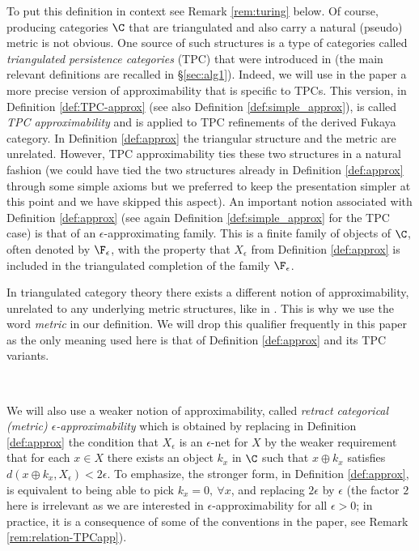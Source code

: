 To put this definition in context see Remark \ref{rem:turing} below. Of course, producing categories $\C$ that are triangulated and also carry a natural (pseudo) metric is not obvious. One source of such structures is a type of categories called {\em triangulated persistence categories} (TPC) that
were introduced in \cite{BCZ:tpc} (the main relevant definitions are recalled in \S\ref{sec:alg1}).  Indeed, we will use in the paper a more precise version of approximability that is specific to TPCs. This version, in Definition \ref{def:TPC-approx} (see also Definition \ref{def:simple_approx}), is called {\em TPC approximability} and is applied to TPC refinements of the derived Fukaya category.  In Definition \ref{def:approx} the triangular structure and the metric are unrelated.  However, TPC approximability  ties these two structures in a natural fashion (we could have tied the two structures already in
Definition \ref{def:approx} through some simple axioms but we preferred to keep the presentation simpler at this point and we have skipped this aspect). 
An important notion associated with Definition \ref{def:approx}  (see again Definition \ref{def:simple_approx} for the TPC case) is that of an $\epsilon$-approximating family. This is a finite family of objects  of $\C$, often denoted by $\F_{\epsilon}$, with the property that $X_{\epsilon}$ from Definition \ref{def:approx} is included in the triangulated completion of the family $\F_{\epsilon}$.

\begin{rem}\label{rem:usual_triang}
In triangulated category theory there exists a different notion of approximability,
unrelated to any underlying metric structures, like in \cite{Neeman:approx_tri}. This is why we use the word {\em metric} in our definition. We will drop this qualifier frequently in this paper as the only meaning used here is that of Definition \ref{def:approx} and its TPC variants.
\end{rem}

\

We will also use a weaker notion of approximability, called {\em retract categorical (metric) $\epsilon$-approximability} which is obtained by replacing in Definition \ref{def:approx} the condition that $X_{\epsilon}$ is an $\epsilon$-net for $X$ by the weaker requirement that for each $x\in X$
there exists an object $k_{x}$ in $\C$ such that $x\oplus k_{x}$ satisfies
$d(x\oplus k_{x}, X_{\epsilon}) < 2\epsilon$. To emphasize, the stronger form, in Definition \ref{def:approx}, is equivalent to being able to pick $k_{x}=0, \ \forall x$, and replacing  $2\epsilon$ by $\epsilon$ (the factor $2$ here is irrelevant as we are interested in $\epsilon$-approximability for all $\epsilon >0$; in practice, it is a consequence of some of the conventions in the paper, see Remark \ref{rem:relation-TPCapp}). 

